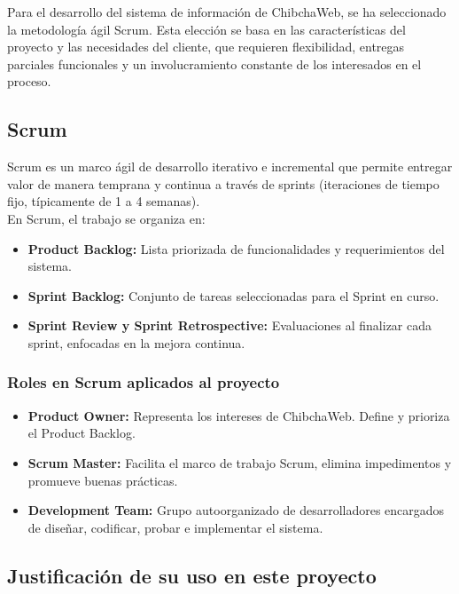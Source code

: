 Para el desarrollo del sistema de información de ChibchaWeb, se ha seleccionado la metodología ágil Scrum. Esta elección se basa en las características del proyecto y las necesidades del cliente, que requieren flexibilidad, entregas parciales funcionales y un involucramiento constante de los interesados en el proceso.

\subsection{Scrum}
Scrum es un marco ágil de desarrollo iterativo e incremental que permite entregar valor de manera temprana y continua a través de sprints (iteraciones de tiempo fijo, típicamente de 1 a 4 semanas).\\
En Scrum, el trabajo se organiza en:

\begin{itemize}
    \item \textbf{Product Backlog:} Lista priorizada de funcionalidades y requerimientos del sistema.
    \item \textbf{Sprint Backlog:} Conjunto de tareas seleccionadas para el Sprint en curso.
    \item \textbf{Sprint Review y Sprint Retrospective:} Evaluaciones al finalizar cada sprint, enfocadas en la mejora continua.
\end{itemize}

\subsubsection{Roles en Scrum aplicados al proyecto}

\begin{itemize}
    \item \textbf{Product Owner:} Representa los intereses de ChibchaWeb. Define y prioriza el Product Backlog.
    \item \textbf{Scrum Master:} Facilita el marco de trabajo Scrum, elimina impedimentos y promueve buenas prácticas.
    \item \textbf{Development Team:} Grupo autoorganizado de desarrolladores encargados de diseñar, codificar, probar e implementar el sistema.
\end{itemize}

\subsection{Justificación de su uso en este proyecto}

